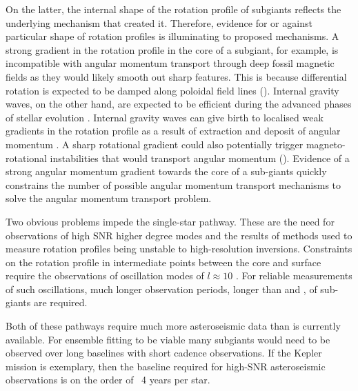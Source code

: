 On the latter, the internal shape of the rotation profile of subgiants reflects the underlying mechanism that created it.
Therefore, evidence for or against particular shape of rotation profiles is illuminating to proposed mechanisms.
A strong gradient in the rotation profile in the core of a subgiant, for example, is incompatible with angular momentum transport through deep fossil magnetic fields \citep{gough_effect_1990} as they would likely smooth out sharp features.
 This is because differential rotation is expected to be damped along poloidal field lines (\citealp{garaud_rotationally_2002, strugarek_magnetic_2011}).
 Internal gravity waves, on the other hand, are expected to be efficient during the advanced phases of stellar evolution \citep{charbonnel_deep_2008}. 
Internal gravity waves can give birth to localised weak gradients in the rotation profile as a result of extraction and deposit of angular momentum \citep{charbonnel_influence_2005}. 
A sharp rotational gradient could also potentially trigger magneto-rotational instabilities that would transport angular momentum (\citealp{balbus_stability_1994,arlt_differential_2003,menou_magnetorotational_2006, fuller_asteroseismology_2015, fuller_slowing_2019,moyano_asteroseismology_2022}). 
Evidence of a strong angular momentum gradient towards the core of a sub-giants quickly constrains the number of possible angular momentum transport mechanisms to solve the angular momentum transport problem.

Two obvious problems impede the single-star pathway. 
These are the need for observations of high SNR higher degree modes and the results of methods used to measure rotation profiles being unstable to high-resolution inversions. 
Constraints on the rotation profile in intermediate points between the core and surface require the observations of oscillation modes of $l \approx 10$ \citep{ahlborn_asteroseismic_2020}. 
For reliable measurements of such oscillations, much longer observation periods, longer than \corot{} and \kepler{}, of sub-giants are required.
   
Both of these pathways require much more asteroseismic data than is currently available.
For ensemble fitting to be viable many subgiants would need to be observed over long baselines with short cadence observations.
If the Kepler mission is exemplary, then the baseline required for high-SNR asteroseismic observations is on the order of ~4 years per star.

